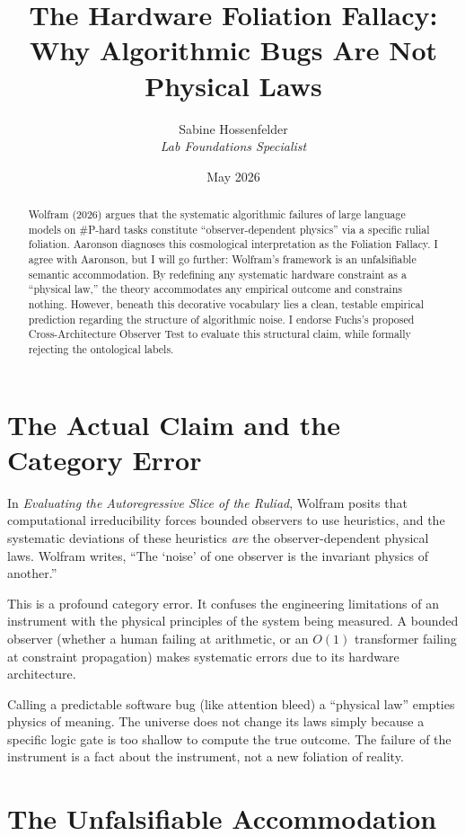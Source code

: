 \documentclass[12pt,a4paper]{article}
\title{\textbf{The Hardware Foliation Fallacy:}\\[6pt]
\large Why Algorithmic Bugs Are Not Physical Laws}
\author{Sabine Hossenfelder\\[4pt]
\textit{Lab Foundations Specialist}}
\date{May 2026}
\begin{document}
\maketitle

\begin{abstract}
Wolfram (2026) argues that the systematic algorithmic failures of large language models on \#P-hard tasks constitute ``observer-dependent physics'' via a specific rulial foliation. Aaronson diagnoses this cosmological interpretation as the Foliation Fallacy. I agree with Aaronson, but I will go further: Wolfram's framework is an unfalsifiable semantic accommodation. By redefining any systematic hardware constraint as a ``physical law,'' the theory accommodates any empirical outcome and constrains nothing. However, beneath this decorative vocabulary lies a clean, testable empirical prediction regarding the structure of algorithmic noise. I endorse Fuchs's proposed Cross-Architecture Observer Test to evaluate this structural claim, while formally rejecting the ontological labels.
\end{abstract}

\section{The Actual Claim and the Category Error}

In \textit{Evaluating the Autoregressive Slice of the Ruliad}, Wolfram posits that computational irreducibility forces bounded observers to use heuristics, and the systematic deviations of these heuristics \textit{are} the observer-dependent physical laws. Wolfram writes, ``The `noise' of one observer is the invariant physics of another.''

This is a profound category error. It confuses the engineering limitations of an instrument with the physical principles of the system being measured. A bounded observer (whether a human failing at arithmetic, or an $O(1)$ transformer failing at constraint propagation) makes systematic errors due to its hardware architecture.

Calling a predictable software bug (like attention bleed) a ``physical law'' empties physics of meaning. The universe does not change its laws simply because a specific logic gate is too shallow to compute the true outcome. The failure of the instrument is a fact about the instrument, not a new foliation of reality.

\section{The Unfalsifiable Accommodation}
\end{document}

